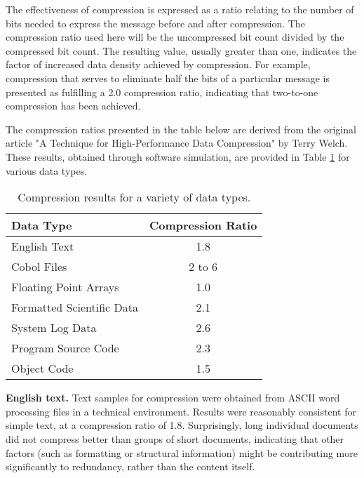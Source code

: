 The effectiveness of compression is expressed as a ratio relating to the number of bits needed to express the message before and after compression. The compression ratio used here will be the uncompressed bit count divided by the compressed bit count. The resulting value, usually greater than one, indicates the factor of increased data density achieved by compression. 
For example, compression that serves to eliminate half the bits of a particular message is presented as fulfilling a 2.0 compression ratio, indicating that two-to-one compression has been achieved.

\vspace{10pt}
The compression ratios presented in the table below are derived from the original article "A Technique for High-Performance Data Compression"\cite{doc2} by Terry Welch. These results, obtained through software simulation, are provided in Table \ref{tab:compression_results} for various data types.

\begin{table}[h!]
\caption{Compression results for a variety of data types.}
\centering
\begin{tabular}{|l|c|}
\hline
\textbf{Data Type}               & \textbf{Compression Ratio} \\ \hline
English Text                     & 1.8                        \\ \hline
Cobol Files                      & 2 to 6                     \\ \hline
Floating Point Arrays            & 1.0                        \\ \hline
Formatted Scientific Data        & 2.1                        \\ \hline
System Log Data                  & 2.6                        \\ \hline
Program Source Code              & 2.3                        \\ \hline
Object Code                      & 1.5                        \\ \hline
\end{tabular}
\label{tab:compression_results}
\end{table}



\textbf{English text.} Text samples for compression were obtained from ASCII word processing files in a technical environment. Results were reasonably consistent for simple text, at a compression ratio of 1.8. Surprisingly, long individual documents did not compress better than groups of short documents, indicating that other factors (such as formatting or structural information) might be contributing more significantly to redundancy, rather than the content itself.

